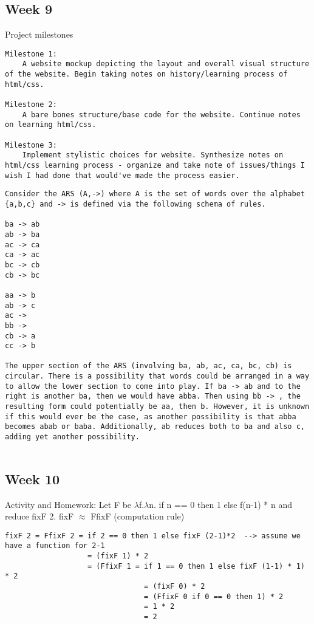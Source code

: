 \documentclass{article}
\theoremstyle{theorem}
\theoremstyle{definition}
\theoremstyle{remark}
\begin{document}
\subsection{Week 9}
Project milestones
\begin{lstlisting}
Milestone 1:
    A website mockup depicting the layout and overall visual structure of the website. Begin taking notes on history/learning process of html/css.

Milestone 2:
    A bare bones structure/base code for the website. Continue notes on learning html/css.

Milestone 3:
    Implement stylistic choices for website. Synthesize notes on html/css learning process - organize and take note of issues/things I wish I had done that would've made the process easier.

\end{lstlisting}


\begin{lstlisting}
Consider the ARS (A,->) where A is the set of words over the alphabet {a,b,c} and -> is defined via the following schema of rules.

ba -> ab
ab -> ba
ac -> ca
ca -> ac
bc -> cb
cb -> bc
 
aa -> b
ab -> c
ac ->  
bb -> 
cb -> a
cc -> b

The upper section of the ARS (involving ba, ab, ac, ca, bc, cb) is circular. There is a possibility that words could be arranged in a way to allow the lower section to come into play. If ba -> ab and to the right is another ba, then we would have abba. Then using bb -> , the resulting form could potentially be aa, then b. However, it is unknown if this would ever be the case, as another possibility is that abba becomes abab or baba. Additionally, ab reduces both to ba and also c, adding yet another possibility. 


\end{lstlisting}

\subsection{Week 10}
Activity and Homework:
\newline\indent
Let F be $\lambda$f.$\lambda$n. if n == 0 then 1 else f(n-1) * n and reduce fixF 2.
\newline\indent
fixF $\approx$ FfixF (computation rule)

\begin{lstlisting}
fixF 2 = FfixF 2 = if 2 == 0 then 1 else fixF (2-1)*2  --> assume we have a function for 2-1
                   = (fixF 1) * 2
                   = (FfixF 1 = if 1 == 0 then 1 else fixF (1-1) * 1) * 2
                                = (fixF 0) * 2
                                = (FfixF 0 if 0 == 0 then 1) * 2
                                = 1 * 2
                                = 2
               
\end{lstlisting}
\end{document}
